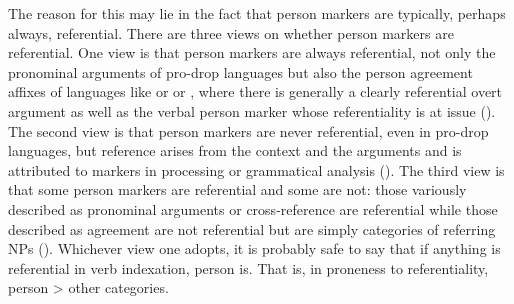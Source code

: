 \documentclass[output=collectionpaper]{langsci/langscibook}
\begin{document}
The reason for this may lie in the fact that person markers are typically, perhaps always, referential. There are three views on whether person markers are referential. One view is that person markers are always referential, not only the pronominal arguments of pro-drop languages but also the person agreement affixes of languages like  or  or , where there is generally a clearly referential overt argument as well as the verbal person marker whose referentiality is at issue (\citealt{Kibrik2011}). The second view is that person markers are never referential, even in pro-drop languages, but reference arises from the context and the arguments and is attributed to markers in processing or grammatical analysis (\citealt{Evans1999,Evans2003}). The third view is that some person markers are referential and some are not: those variously described as pronominal arguments or cross-reference are referential while those described as agreement are not referential but are simply categories of referring NPs (\citealt{Hengeveld2012}). Whichever view one adopts, it is probably safe to say that if anything is referential in verb indexation, person is. That is, in proneness to referentiality, person > other categories.
\end{document}
